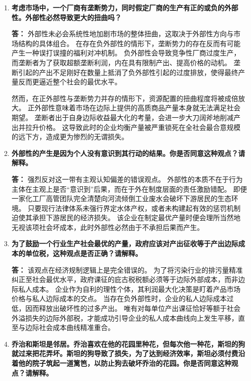 \begin{enumerate}[label=\textbf{\arabic*.}, leftmargin=*]
		\item \textbf{考虑市场中，一个厂商有垄断势力，同时假定厂商的生产有正的或负的外部性。外部性必然导致更大的扭曲吗？}
		
		\textbf{答：} 外部性未必会系统性地加剧市场的整体扭曲，这取决于外部性方向与市场结构的具体组合。
		在存在负外部性的情形下，垄断势力的存在反而有可能产生一种误打误撞的福利对冲机制。
		负外部性会导致竞争性厂商过度生产，而垄断者为了获取超额垄断利润，内在具有限制产出、提高价格的动机。
		垄断引起的产出不足刚好在数量上抵消了负外部性引起的过度排放，使得最终产量反而更逼近整个社会的最优水平。
		
		然而，在正外部性与垄断势力并存的情形下，资源配置的扭曲程度将被成倍放大。
		正外部性意味着市场在边际上提供的高质商品产量本身就无法满足社会期望。
		垄断者出于自身边际收益最大化的考量，会进一步大刀阔斧地削减产出并拉升价格。
		这导致此时的企业均衡产量被严重锁死在全社会最合意规模的远下方，造成更为惨烈的无谓损失。
		
		\item \textbf{外部性的产生是因为个人没有意识到其行动的结果。你是否同意这种观点？请解释。}
		
		\textbf{答：} 强烈反对这一带有主观认知偏差的错误观点。
		外部性的本质不在于行为主体在主观上是否“意识到”后果，而在于外在制度层面的责任激励错配。
		即便一家化工厂高管团队完全清楚向河流倾倒工业废水会破坏下游居民的生态环境。
		只要现行法律体系未强行界定水体产权，或者未构建起有效的惩罚机制迫使其承担下游居民的经济损失。
		该企业在制定最优产量时便会理所当然地无视该项社会坏成本，此时外部性必然由于不承担后果而产生。
		
		\item \textbf{为了鼓励一个行业生产社会最优的产量，政府应该对产出征收等于产出边际成本的单位税，这种观点是否正确？请解释。}
		
		\textbf{答：} 该观点在经济规制逻辑上是完全错误的。
		为了将污染行业的排污量精准纠正至社会最优水平，政府课征的庇古税税额必须等于边际外部成本，而非边际私人成本。
		企业作为自利的理性个体，其利润最大化决策是盯着产品市场价格与私人边际成本的交点。
		当存在负外部性时，企业的私人边际成本过低，因而释放出破坏性的过多产出。
		唯有对每单位产出课征恰好等额于社会外溢损失的边际外部税，才能成功引导企业的私人成本曲线向上发生平移，直至与边际社会成本曲线精准重合。
		
		\item \textbf{乔治和斯坦是邻居。乔治喜欢在他的花园里种花，但每次他一种花，斯坦的狗就过来把花弄坏。斯坦的狗导致了损失，为了达到经济效率，斯坦必须付费沿着他的院子筑起一道篱笆，以防止狗去破坏乔治的花园。你是否同意这种观点？请解释。}
		

\end{enumerate}
